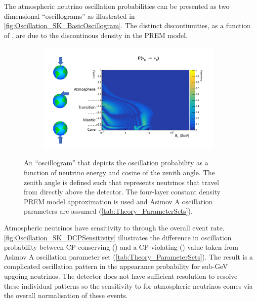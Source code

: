 The atmospheric neutrino oscillation probabilities can be presented as two dimensional ``oscillograms'' as illustrated in \autoref{fig:Oscillation_SK_BasicOscillogram}. The distinct discontinuities, as a function of , are due to the discontinous density in the PREM model.

\begin{figure}[h]
  \begin{subfigure}[t]{0.8\textwidth}
    \includegraphics[width=\textwidth, trim={0mm 0mm 0mm 0mm}, clip,page=1]{Figures/Oscillation/BasicOscillogramWithNotes.pdf}
  \end{subfigure}
  \caption{An ``oscillogram'' that depicts the  oscillation probability as a function of neutrino energy and cosine of the zenith angle. The zenith angle is defined such that  represents neutrinos that travel from directly above the detector. The four-layer constant density PREM model approximation is used and Asimov A oscillation parameters are assumed (\autoref{tab:Theory_ParameterSets}).}
  \label{fig:Oscillation_SK_BasicOscillogram}
\end{figure}

Atmospheric neutrinos have sensitivity to  through the overall event rate. \autoref{fig:Oscillation_SK_DCPSensitivity} illustrates the difference in oscillation probability between CP-conserving () and a CP-violating () value taken from Asimov A oscillation parameter set (\autoref{tab:Theory_ParameterSets}). The result is a complicated oscillation pattern in the appearance probability for sub-GeV upgoing neutrinos. The detector does not have sufficient resolution to resolve these individual patterns so the sensitivity to  for atmospheric neutrinos comes via the overall normalisation of these events.


